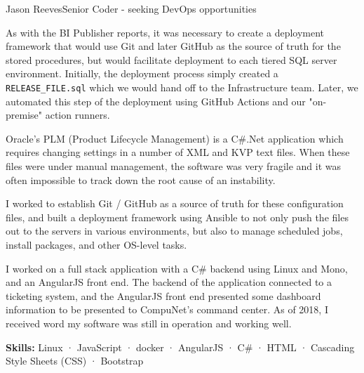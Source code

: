 \documentclass{article}
\begin{document}
\begin{cv}[avatar]{Jason Reeves}{Senior Coder - seeking DevOps opportunities}
\begin{cvevent}[2018-2020]
    \vspace*{3mm}
    As with the BI Publisher reports, it was necessary to create a deployment framework that would use Git and later GitHub as the source of truth for the stored procedures, but would facilitate deployment to each tiered SQL server environment.  Initially, the deployment process simply created a \texttt{RELEASE\_FILE.sql} which we would hand off to the Infrastructure team.  Later, we automated this step of the deployment using GitHub Actions and our "on-premise" action runners.
    \vspace*{5mm}
\end{cvevent}

\begin{cvevent}[2018-2020]
    Oracle's PLM (Product Lifecycle Management) is a C\#.Net application which requires changing settings in a number of XML and KVP text files.  When these files were under manual management, the software was very fragile and it was often impossible to track down the root cause of an instability.

    \vspace*{3mm}
    I worked to establish Git / GitHub as a source of truth for these configuration files, and built a deployment framework using Ansible to not only push the files out to the servers in various environments, but also to manage scheduled jobs, install packages, and other OS-level tasks.  
    \vspace*{5mm}
\end{cvevent}

\begin{cvevent}[Sep 2016][Sep 2017]
  I worked on a full stack application with a C\# backend using Linux and Mono, and an AngularJS front end. The backend of the application connected to a ticketing system, and the AngularJS front end presented some dashboard information to be presented to CompuNet's command center. As of 2018, I received word my software was still in operation and working well.
  
  \vspace*{3mm}
  \textbf{Skills:} Linux · JavaScript · docker · AngularJS · C\# · HTML · Cascading Style Sheets (CSS) · Bootstrap
  \vspace*{5mm}
\end{cvevent}


\end{cv}
\end{document}
